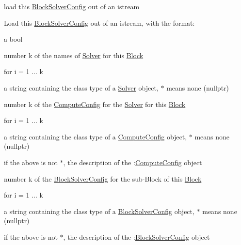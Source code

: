 load this \mbox{\hyperlink{class_s_m_spp__di__unipi__it_1_1_block_solver_config}{Block\+Solver\+Config}} out of an istream 

Load this \mbox{\hyperlink{class_s_m_spp__di__unipi__it_1_1_block_solver_config}{Block\+Solver\+Config}} out of an istream, with the format\+:

a bool

number k of the names of \mbox{\hyperlink{class_s_m_spp__di__unipi__it_1_1_solver}{Solver}} for this \mbox{\hyperlink{class_s_m_spp__di__unipi__it_1_1_block}{Block}}

for i = 1 ... k
\begin{DoxyItemize}
\item a string containing the class type of a \mbox{\hyperlink{class_s_m_spp__di__unipi__it_1_1_solver}{Solver}} object, \textquotesingle{}$\ast$\textquotesingle{} means none (nullptr)
\end{DoxyItemize}

number k of the \mbox{\hyperlink{class_s_m_spp__di__unipi__it_1_1_compute_config}{Compute\+Config}} for the \mbox{\hyperlink{class_s_m_spp__di__unipi__it_1_1_solver}{Solver}} for this \mbox{\hyperlink{class_s_m_spp__di__unipi__it_1_1_block}{Block}}

for i = 1 ... k
\begin{DoxyItemize}
\item a string containing the class type of a \mbox{\hyperlink{class_s_m_spp__di__unipi__it_1_1_compute_config}{Compute\+Config}} object, \textquotesingle{}$\ast$\textquotesingle{} means none (nullptr)
\item if the above is not \textquotesingle{}$\ast$\textquotesingle{}, the description of the \+:\mbox{\hyperlink{class_s_m_spp__di__unipi__it_1_1_compute_config}{Compute\+Config}} object
\end{DoxyItemize}

number k of the \mbox{\hyperlink{class_s_m_spp__di__unipi__it_1_1_block_solver_config}{Block\+Solver\+Config}} for the sub-\/\+Block of this \mbox{\hyperlink{class_s_m_spp__di__unipi__it_1_1_block}{Block}}

for i = 1 ... k
\begin{DoxyItemize}
\item a string containing the class type of a \mbox{\hyperlink{class_s_m_spp__di__unipi__it_1_1_block_solver_config}{Block\+Solver\+Config}} object, \textquotesingle{}$\ast$\textquotesingle{} means none (nullptr)
\item if the above is not \textquotesingle{}$\ast$\textquotesingle{}, the description of the \+:\mbox{\hyperlink{class_s_m_spp__di__unipi__it_1_1_block_solver_config}{Block\+Solver\+Config}} object 
\end{DoxyItemize}

